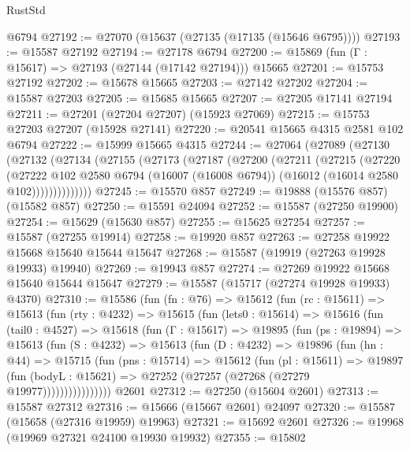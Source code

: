 \begin{lexlean}{RustStd}
\begin{coremodule}
    @6794
@27192 := @27070 (@15637 (@27135 (@17135 (@15646 @6795))))
@27193 := @15587 @27192
@27194 := @27178 @6794
@27200 := @15869 (fun (Γ : @15617) => @27193 (@27144 (@17142 @27194))) @15665
@27201 := @15753 @27192
@27202 := @15678 @15665
@27203 := @27142 @27202
@27204 := @15587 @27203
@27205 := @15685 @15665
@27207 := @27205 @17141 @27194
@27211 := @27201 (@27204 @27207) (@15923 @27069)
@27215 := @15753 @27203 @27207 (@15928 @27141)
@27220 := @20541 @15665 @4315 @2581 @102 @6794
@27222 := @15999 @15665 @4315
@27244 := @27064
    (@27089
      (@27130
        (@27132
          (@27134
            (@27155
              (@27173
                (@27187
                  (@27200
                    (@27211
                      (@27215
                        (@27220
                          (@27222
                            @102
                            @2580
                            @6794
                            (@16007 (@16008 @6794))
                            (@16012 (@16014 @2580 @102))))))))))))))
@27245 := @15570 @857
@27249 := @19888 (@15576 @857) (@15582 @857)
@27250 := @15591 @24094
@27252 := @15587 (@27250 @19900)
@27254 := @15629 (@15630 @857)
@27255 := @15625 @27254
@27257 := @15587 (@27255 @19914)
@27258 := @19920 @857
@27263 := @27258 @19922 @15668 @15640 @15644 @15647
@27268 := @15587 (@19919 (@27263 @19928 @19933) @19940)
@27269 := @19943 @857
@27274 := @27269 @19922 @15668 @15640 @15644 @15647
@27279 := @15587 (@15717 (@27274 @19928 @19933) @4370)
@27310 := @15586
    (fun (fn : @76) =>
    @15612
      (fun (rc : @15611) =>
      @15613
        (fun (rty : @4232) =>
        @15615
          (fun (lets0 : @15614) =>
          @15616
            (fun (tail0 : @4527) =>
            @15618
              (fun (Γ : @15617) =>
              @19895
                (fun (ps : @19894) =>
                @15613
                  (fun (S : @4232) =>
                  @15613
                    (fun (D : @4232) =>
                    @19896
                      (fun (hn : @44) =>
                      @15715
                        (fun (pns : @15714) =>
                        @15612
                          (fun (pl : @15611) =>
                          @19897
                            (fun (bodyL : @15621) =>
                            @27252 (@27257 (@27268 (@27279 @19977))))))))))))))))
    @2601
@27312 := @27250 (@15604 @2601)
@27313 := @15587 @27312
@27316 := @15666 (@15667 @2601) @24097
@27320 := @15587 (@15658 (@27316 @19959) @19963)
@27321 := @15692 @2601
@27326 := @19968 (@19969 @27321 @24100 @19930 @19932)
@27355 := @15802

\end{coremodule}
\end{lexlean}
